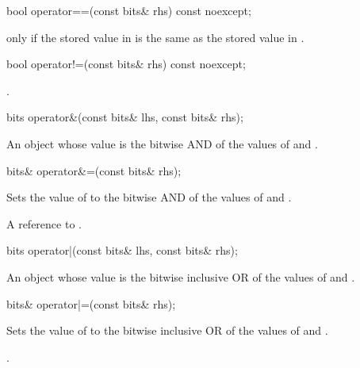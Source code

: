 \begin{itemdecl}
bool operator==(const bits& rhs) const noexcept;		
\end{itemdecl}

\begin{itemdescr}
\returns {} only if the stored value in  is the same as the stored value in .		
\end{itemdescr}

\begin{itemdecl}
bool operator!=(const bits& rhs) const noexcept;		
\end{itemdecl}

\begin{itemdescr}
\returns {}.		
\end{itemdescr}

\begin{itemdecl}
bits operator&(const bits& lhs, const bits& rhs);		
\end{itemdecl}

\begin{itemdescr}
\returns An object whose value is the bitwise AND of the values of  and .		
\end{itemdescr}

\begin{itemdecl}
bits& operator&=(const bits& rhs);		
\end{itemdecl}

\begin{itemdescr}
\effects Sets the value of  to the bitwise AND of the values of  and .

\returns A reference to .		
\end{itemdescr}

\begin{itemdecl}
bits operator|(const bits& lhs, const bits& rhs);		
\end{itemdecl}

\begin{itemdescr}
\returns An object whose value is the bitwise inclusive OR of the values of  and .		
\end{itemdescr}

\begin{itemdecl}
bits& operator|=(const bits& rhs);		
\end{itemdecl}

\begin{itemdescr}
\effects Sets the value of  to the bitwise inclusive OR of the values of  and .

\returns {}.		
\end{itemdescr}

